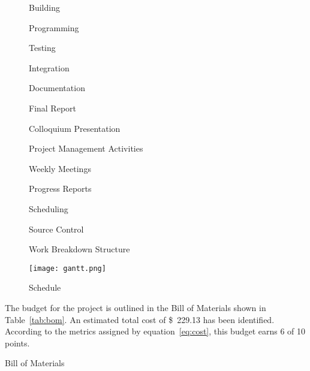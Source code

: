 \documentclass{article}
\begin{document}
\begin{figure}[htb]
\begin{framed}
\begin{enumerate*}
\begin{enumerate*}
                    \begin{enumerate*}
                        \item Building
                        \item Programming
                        \item Testing
                        \item Integration
                        \item Documentation
                    \end{enumerate*}
                \end{enumerate*}
                \item Final Report
                \item Colloquium Presentation
                \item Project Management Activities
                \begin{enumerate*}
                    \item Weekly Meetings
                    \item Progress Reports
                    \item Scheduling
                    \item Source Control
                \end{enumerate*}
            \end{enumerate*}
            \end{framed}
            \caption{Work Breakdown Structure}
            \label{fig:work_breakdown_structure}
        \end{figure}

        \begin{sidewaysfigure}[htb]
            \centering
            \texttt{[image: gantt.png]}
            \caption{Schedule}
            \label{fig:gantt}
        \end{sidewaysfigure}

        The budget for the project is outlined in the Bill of Materials
        shown in Table~\ref{tab:bom}.
        An estimated total cost of \SI{229.13}[\$]{} has been identified.
        According to the metrics assigned by equation~\ref{eq:cost},
        this budget earns 6 of 10 points.

        \begin{table}[htb]
            \centering
            
            \caption{Bill of Materials}
            \label{tab:bom}
        \end{table}
\end{document}
